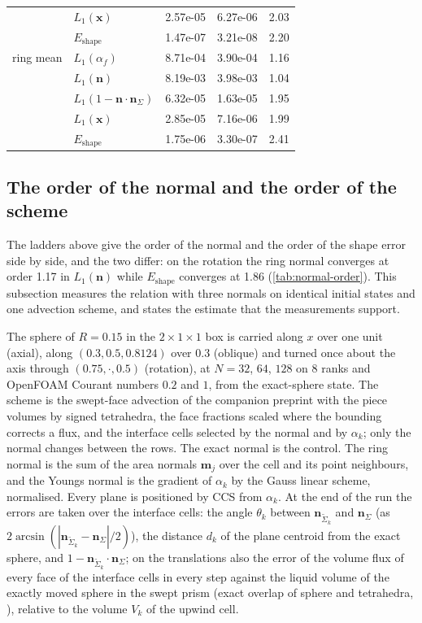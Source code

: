 \documentclass[preprint,12pt]{elsarticle}
\newcommand{\n}{\mathbf{n}}
\newcommand{\nSk}{\mathbf{n}_{\tilde{\Sigma}_k}}
\begin{document}
\begin{table}[htbp]
\begin{tabular}{llrrr}
 & $L_1(\mathbf{x})$ & 2.57e-05 & 6.27e-06 & 2.03 \\
 & $E_{\mathrm{shape}}$ & 1.47e-07 & 3.21e-08 & 2.20 \\
ring mean & $L_1(\alpha_f)$ & 8.71e-04 & 3.90e-04 & 1.16 \\
 & $L_1(\mathbf{n})$ & 8.19e-03 & 3.98e-03 & 1.04 \\
 & $L_1(1-\mathbf{n}\cdot\mathbf{n}_\Sigma)$ & 6.32e-05 & 1.63e-05 & 1.95 \\
 & $L_1(\mathbf{x})$ & 2.85e-05 & 7.16e-06 & 1.99 \\
 & $E_{\mathrm{shape}}$ & 1.75e-06 & 3.30e-07 & 2.41 \\
\bottomrule
\end{tabular}
\end{table}

\subsection{The order of the normal and the order of the scheme}
\label{sec:tpf-normalorder}

The ladders above give the order of the normal and the order of the shape error side by side, and the two differ: on the rotation the ring normal converges at order 1.17 in $L_1(\mathbf{n})$ while $E_{\mathrm{shape}}$ converges at 1.86 (\cref{tab:normal-order}). This subsection measures the relation with three normals on identical initial states and one advection scheme, and states the estimate that the measurements support.

The sphere of $R = 0.15$ in the $2\times1\times1$ box is carried along $x$ over one unit (axial), along $(0.3, 0.5, 0.8124)$ over $0.3$ (oblique) and turned once about the axis through $(0.75, \cdot, 0.5)$ (rotation), at $N = 32$, $64$, $128$ on 8 ranks and OpenFOAM Courant numbers $0.2$ and $1$, from the exact-sphere state. The scheme is the swept-face advection of the companion preprint \citep{MaricSweptAdvection2026} with the piece volumes by signed tetrahedra, the face fractions scaled where the bounding corrects a flux, and the interface cells selected by the normal and by $\alpha_k$; only the normal changes between the rows. The exact normal is the control. The ring normal is the sum of the area normals $\mathbf{m}_j$ over the cell and its point neighbours, and the Youngs normal is the gradient of $\alpha_k$ by the Gauss linear scheme, normalised. Every plane is positioned by CCS from $\alpha_k$. At the end of the run the errors are taken over the interface cells: the angle $\theta_k$ between $\nSk$ and $\n_\Sigma$ (as $2\arcsin(|\nSk - \n_\Sigma|/2)$), the distance $d_k$ of the plane centroid from the exact sphere, and $1 - \nSk\cdot\n_\Sigma$; on the translations also the error of the volume flux of every face of the interface cells in every step against the liquid volume of the exactly moved sphere in the swept prism (exact overlap of sphere and tetrahedra, \citealt{StroblFormellaPoeschel2016}), relative to the volume $V_k$ of the upwind cell.
\end{document}
